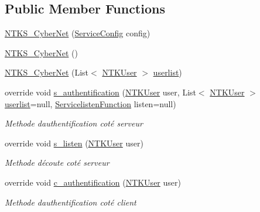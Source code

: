 \subsection*{Public Member Functions}
\begin{DoxyCompactItemize}
\item 
\mbox{\hyperlink{class_n_t_k_1_1_service_1_1_n_t_k_s___cyber_net_a29df9eabbc2e3e1ff3d4078e7c198edd}{N\+T\+K\+S\+\_\+\+Cyber\+Net}} (\mbox{\hyperlink{struct_n_t_k_1_1_service_1_1_service_config}{Service\+Config}} config)
\item 
\mbox{\hyperlink{class_n_t_k_1_1_service_1_1_n_t_k_s___cyber_net_a9e0e3e3154d5519211dcc25c9f90938b}{N\+T\+K\+S\+\_\+\+Cyber\+Net}} ()
\item 
\mbox{\hyperlink{class_n_t_k_1_1_service_1_1_n_t_k_s___cyber_net_a74c9149b1256926d7c06d30338dd432a}{N\+T\+K\+S\+\_\+\+Cyber\+Net}} (List$<$ \mbox{\hyperlink{class_n_t_k_1_1_n_t_k_user}{N\+T\+K\+User}} $>$ \mbox{\hyperlink{class_n_t_k_1_1_service_1_1_n_t_k_service_a14977c798a805fea99802fa40da31aa0}{userlist}})
\item 
override void \mbox{\hyperlink{class_n_t_k_1_1_service_1_1_n_t_k_s___cyber_net_a501511cb6bf57d9e60b04af04d99586f}{s\+\_\+authentification}} (\mbox{\hyperlink{class_n_t_k_1_1_n_t_k_user}{N\+T\+K\+User}} user, List$<$ \mbox{\hyperlink{class_n_t_k_1_1_n_t_k_user}{N\+T\+K\+User}} $>$ \mbox{\hyperlink{class_n_t_k_1_1_service_1_1_n_t_k_service_a14977c798a805fea99802fa40da31aa0}{userlist}}=null, \mbox{\hyperlink{namespace_n_t_k_1_1_service_a49f4581ae6fb3e9c155d034c47791db9}{Servicelisten\+Function}} listen=null)
\begin{DoxyCompactList}\small\item\em Methode d\textquotesingle{}authentification coté serveur \end{DoxyCompactList}\item 
override void \mbox{\hyperlink{class_n_t_k_1_1_service_1_1_n_t_k_s___cyber_net_a1584c291a5292d44e3076eaf3c3c1c67}{s\+\_\+listen}} (\mbox{\hyperlink{class_n_t_k_1_1_n_t_k_user}{N\+T\+K\+User}} user)
\begin{DoxyCompactList}\small\item\em Methode d\textquotesingle{}écoute coté serveur \end{DoxyCompactList}\item 
override void \mbox{\hyperlink{class_n_t_k_1_1_service_1_1_n_t_k_s___cyber_net_aafeaa95314fc42dad77b9488f10be803}{c\+\_\+authentification}} (\mbox{\hyperlink{class_n_t_k_1_1_n_t_k_user}{N\+T\+K\+User}} user)
\begin{DoxyCompactList}\small\item\em Methode d\textquotesingle{}authentification coté client \end{DoxyCompactList}\item 

\end{DoxyCompactItemize}
